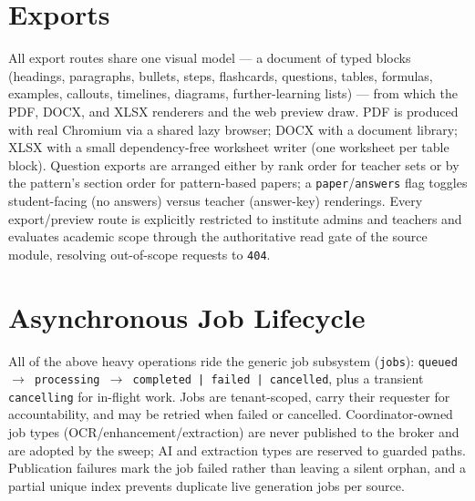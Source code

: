 \section{Exports}

All export routes share one visual model --- a document of typed blocks
(headings, paragraphs, bullets, steps, flashcards, questions, tables,
formulas, examples, callouts, timelines, diagrams, further-learning lists) ---
from which the PDF, DOCX, and XLSX renderers and the web preview draw. PDF is
produced with real Chromium via a shared lazy browser; DOCX with a document
library; XLSX with a small dependency-free worksheet writer (one worksheet per
table block). Question exports are arranged either by rank order for teacher
sets or by the pattern's section order for pattern-based papers; a
\texttt{paper}/\texttt{answers} flag toggles student-facing (no answers) versus
teacher (answer-key) renderings. Every export/preview route is explicitly
restricted to institute admins and teachers and evaluates academic scope
through the authoritative read gate of the source module, resolving out-of-scope
requests to \texttt{404}.

\section{Asynchronous Job Lifecycle}

All of the above heavy operations ride the generic job subsystem
(\texttt{jobs}): \texttt{queued $\rightarrow$ processing $\rightarrow$
completed | failed | cancelled}, plus a transient \texttt{cancelling} for
in-flight work. Jobs are tenant-scoped, carry their requester for
accountability, and may be retried when failed or cancelled. Coordinator-owned
job types (OCR/enhancement/extraction) are never published to the broker and
are adopted by the sweep; AI and extraction types are reserved to guarded
paths. Publication failures mark the job failed rather than leaving a silent
orphan, and a partial unique index prevents duplicate live generation jobs per
source.